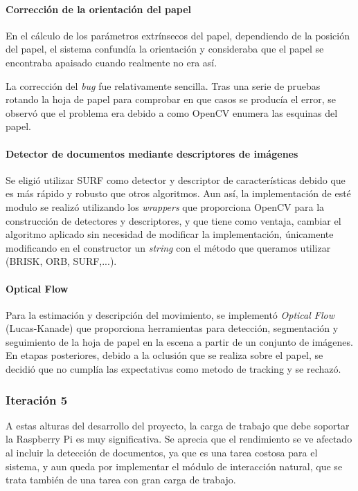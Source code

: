 \paragraph{Corrección de la orientación del papel}
En el cálculo de los parámetros extrínsecos del papel, dependiendo de la posición del papel, el sistema confundía la orientación y consideraba que el papel se encontraba apaisado cuando realmente no era así.

La corrección del \textit{bug} fue relativamente sencilla. Tras una serie de pruebas rotando la hoja de papel para comprobar en que casos se producía el error, se observó que el problema era debido a como OpenCV enumera las esquinas del papel. 

\paragraph{Detector de documentos mediante descriptores de imágenes} 
Se eligió utilizar SURF como detector y descriptor de características debido que es más rápido y robusto que otros algoritmos. Aun así, la implementación de esté modulo se realizó utilizando los \textit{wrappers} que proporciona OpenCV para la construcción de detectores y descriptores, y que tiene como ventaja, cambiar el algoritmo aplicado sin necesidad de modificar la implementación, únicamente modificando en el constructor un \textit{string} con el método que queramos utilizar (BRISK, ORB, SURF,...).

\paragraph{Optical Flow}
Para la estimación y descripción del movimiento, se implementó \textit{Optical Flow} (Lucas-Kanade) que proporciona herramientas para detección, segmentación y seguimiento de la hoja de papel en la escena a partir de un conjunto de imágenes. En etapas posteriores, debido a la oclusión que se realiza sobre el papel, se decidió que no cumplía las expectativas como metodo de tracking y se rechazó. 

\subsubsection{Iteración 5}
A estas alturas del desarrollo del proyecto, la carga de trabajo que debe soportar la Raspberry Pi es muy significativa. Se aprecia que el rendimiento se ve afectado al incluir la detección de documentos, ya que es una tarea costosa para el sistema, y aun queda por implementar el módulo de interacción natural, que se trata también de una tarea con gran carga de trabajo.

